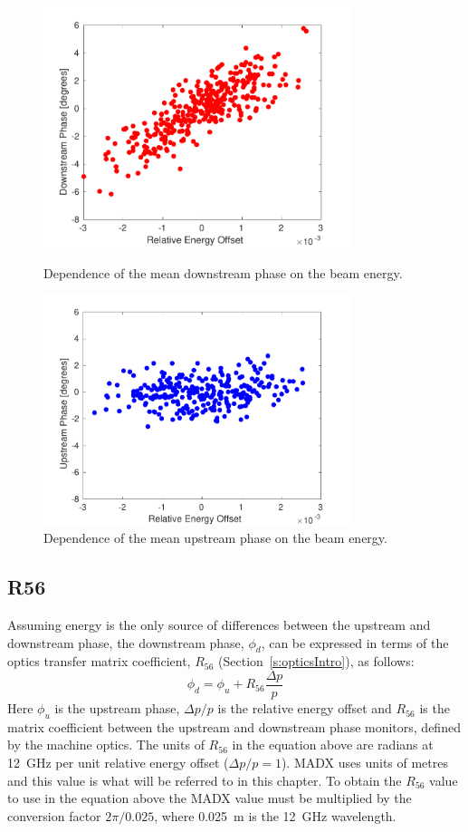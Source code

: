 \begin{figure}
  \centering
    \includegraphics[width=0.8\textwidth]{Figures/propagation/corrDownstreamEn}
  \caption{Dependence of the mean downstream phase on the beam energy.}
  \label{f:corrDownstream_En}
  \includegraphics[width=0.8\textwidth]{Figures/propagation/corrUpstreamEn}
  \caption{Dependence of the mean upstream phase on the beam energy.}
  \label{f:corrUpstream_En}
\end{figure}

\subsection{R56}
\label{ss:r56Equations}

Assuming energy is the only source of differences between the upstream and downstream phase, the downstream phase, \(\phi_d\), can be expressed in terms of the optics transfer matrix coefficient, \(R_{56}\) (Section~\ref{s:opticsIntro}), as follows:
\begin{equation}
\phi_d = \phi_u + R_{56}\frac{\Delta p}{p}
\label{e:r56PhasEq}
\end{equation}
Here \(\phi_u\) is the upstream phase, \(\Delta p / p\) is the relative energy offset and \(R_{56}\) is the matrix coefficient between the upstream and downstream phase monitors, defined by the machine optics. The units of \(R_{56}\) in the equation above are radians at 12~GHz per unit relative energy offset (\(\Delta p/p = 1\)). MADX uses units of metres and this value is what will be referred to in this chapter. To obtain the \(R_{56}\) value to use in the equation above the MADX value must be multiplied by the conversion factor \(2\pi/0.025\), where 0.025~m is the 12~GHz wavelength.

